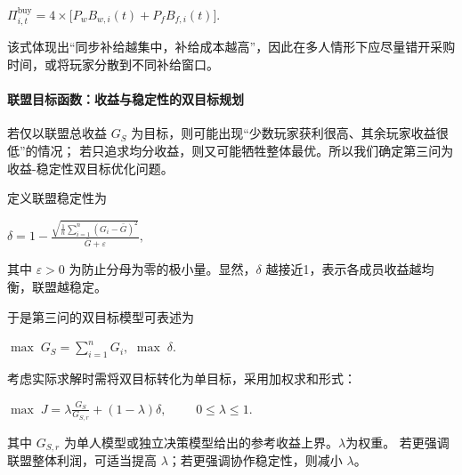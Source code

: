 \begin{center}
    $\Pi_{i,t}^{\text{buy}}=4\times \big[P_w B_{w,i}(t)+P_f B_{f,i}(t)\big].$
\end{center}

该式体现出“同步补给越集中，补给成本越高”，因此在多人情形下应尽量错开采购时间，或将玩家分散到不同补给窗口。

\paragraph{联盟目标函数：收益与稳定性的双目标规划}

若仅以联盟总收益 $G_S$ 为目标，则可能出现“少数玩家获利很高、其余玩家收益很低”的情况；
%
若只追求均分收益，则又可能牺牲整体最优。所以我们确定第三问为收益-稳定性双目标优化问题。

定义联盟稳定性为

\begin{center}
    $\delta =1-\frac{\sqrt{\frac1n\sum_{i=1}^n(G_i-\bar G)^2}}{\bar G+\varepsilon},$
\end{center}

其中 $\varepsilon>0$ 为防止分母为零的极小量。显然，$\delta$ 越接近1，表示各成员收益越均衡，联盟越稳定。

于是第三问的双目标模型可表述为

\begin{center}
    $\max\; G_S=\sum_{i=1}^n G_i,$
    $\max\; \delta.$
\end{center}

考虑实际求解时需将双目标转化为单目标，采用加权求和形式：

\begin{center}
    $\max\; J=\lambda \frac{G_S}{G_{S,r}}+(1-\lambda)\delta,$
    $\qquad 0\le \lambda\le 1.$
\end{center}

其中 $G_{S,r}$ 为单人模型或独立决策模型给出的参考收益上界。$\lambda$为权重。
%
若更强调联盟整体利润，可适当提高 $\lambda$；若更强调协作稳定性，则减小 $\lambda$。

